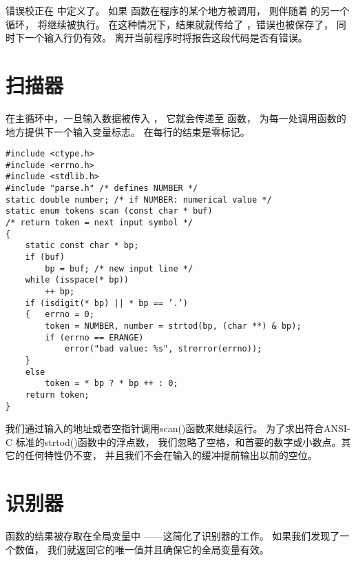 错误校正在  中定义了。
如果  函数在程序的某个地方被调用，
则伴随着  的另一个循环， 将继续被执行。
在这种情况下，结果就就传给了 ，错误也被保存了，
同时下一个输入行仍有效。
离开当前程序时将报告这段代码是否有错误。


\section{扫描器}
\label{sec:scanner}

在主循环中，一旦输入数据被传入 ，
它就会传递至  函数，
为每一处调用函数的地方提供下一个输入变量标志。
在每行的结束是零标记。

\begin{lstlisting}
#include <ctype.h>
#include <errno.h>
#include <stdlib.h>
#include "parse.h" /* defines NUMBER */
static double number; /* if NUMBER: numerical value */
static enum tokens scan (const char * buf)
/* return token = next input symbol */
{   
    static const char * bp;
    if (buf)
        bp = buf; /* new input line */
    while (isspace(* bp))
        ++ bp;
    if (isdigit(* bp) || * bp == ’.’)
    {   errno = 0;
        token = NUMBER, number = strtod(bp, (char **) & bp);
        if (errno == ERANGE)
            error("bad value: %s", strerror(errno));
    }
    else
        token = * bp ? * bp ++ : 0;
    return token;
}
\end{lstlisting}

我们通过输入的地址或者空指针调用scan()函数来继续运行。
为了求出符合ANSI-C 标准的strtod()函数中的浮点数，
我们忽略了空格，和首要的数字或小数点。其它的任何特性仍不变，%
并且我们不会在输入的缓冲提前输出以前的空位。


\section{识别器}
\label{sec:recogn}

 函数的结果被存取在全局变量中
——这简化了识别器的工作。
如果我们发现了一个数值，
我们就返回它的唯一值并且确保它的全局变量有效。

